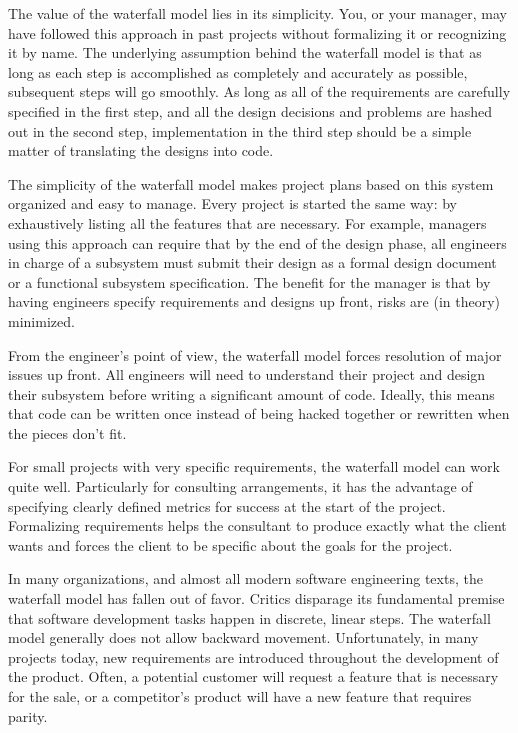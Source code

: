 
The value of the waterfall model lies in its simplicity. You, or your manager, may have followed this approach in past projects without formalizing it or recognizing it by name. The underlying assumption behind the waterfall model is that as long as each step is accomplished as completely and accurately as possible, subsequent steps will go smoothly. As long as all of the requirements are carefully specified in the first step, and all the design decisions and problems are hashed out in the second step, implementation in the third step should be a simple matter of translating the designs into code.

The simplicity of the waterfall model makes project plans based on this system organized and easy to manage. Every project is started the same way: by exhaustively listing all the features that are necessary. For example, managers using this approach can require that by the end of the design phase, all engineers in charge of a subsystem must submit their design as a formal design document or a functional subsystem specification. The benefit for the manager is that by having engineers specify requirements and designs up front, risks are (in theory) minimized.

From the engineer’s point of view, the waterfall model forces resolution of major issues up front. All engineers will need to understand their project and design their subsystem before writing a significant amount of code. Ideally, this means that code can be written once instead of being hacked together or rewritten when the pieces don’t fit.

For small projects with very specific requirements, the waterfall model can work quite well. Particularly for consulting arrangements, it has the advantage of specifying clearly defined metrics for success at the start of the project. Formalizing requirements helps the consultant to produce exactly what the client wants and forces the client to be specific about the goals for the project.


In many organizations, and almost all modern software engineering texts, the waterfall model has fallen out of favor. Critics disparage its fundamental premise that software development tasks happen in discrete, linear steps. The waterfall model generally does not allow backward movement. Unfortunately, in many projects today, new requirements are introduced throughout the development of the product. Often, a potential customer will request a feature that is necessary for the sale, or a competitor’s product will have a new feature that requires parity.

